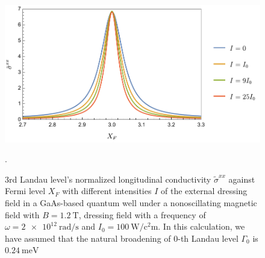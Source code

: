 \begin{figure}[t]
\includegraphics[scale=0.575]{figures/fig_5}
\caption{$3$rd Landau level’s normalized longitudinal conductivity $\widetilde{\sigma}^{xx}$ against Fermi level $X_F$ with different intensities $I$ of the external dressing field in a GaAs-based quantum well under a nonoscillating magnetic field with $B = \SI{1.2}{\tesla}$, dressing field with a frequency of $\omega =\SI{2e12}{\radian\per\second}$ and $I_0 =\SI{100}{\watt\per\square\centi\metre}$.
In this calculation, we have assumed that the natural  broadening of $0$-th Landau level $\Gamma_0$ is $\SI{0.24}{\milli\eV}$}.
\label{fig:6}
\end{figure}
